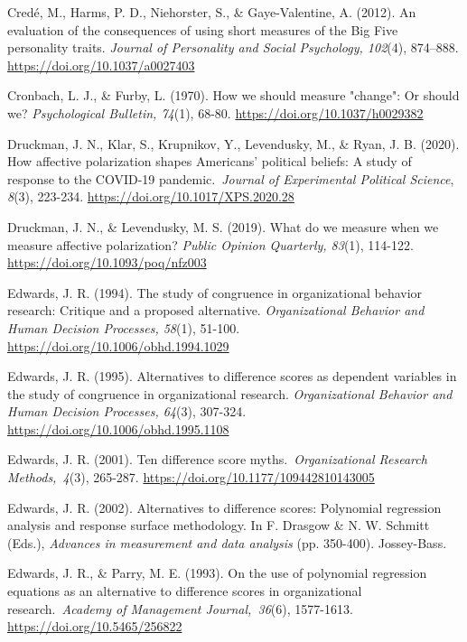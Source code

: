 \documentclass[authordate, meta, issue]{jote-new-article}
\begin{document}
	Credé, M., Harms, P. D., Niehorster, S., \& Gaye-Valentine, A. (2012). An evaluation of the consequences of using short measures of the Big Five personality traits. \emph{Journal of Personality and Social Psychology, 102}(4), 874--888. \url{https://doi.org/10.1037/a0027403}



	Cronbach, L. J., \& Furby, L. (1970). How we should measure "change": Or should we? \emph{Psychological Bulletin, 74}(1), 68-80. \url{https://doi.org/10.1037/h0029382}



	Druckman, J. N., Klar, S., Krupnikov, Y., Levendusky, M., \& Ryan, J. B. (2020). How affective polarization shapes Americans' political beliefs: A study of response to the COVID-19 pandemic. \emph{Journal of Experimental Political Science}, \emph{8}(3), 223-234. \url{https://doi.org/10.1017/XPS.2020.28}


	Druckman, J. N., \& Levendusky, M. S. (2019). What do we measure when we measure affective polarization? \emph{Public Opinion Quarterly, 83}(1), 114-122. \url{https://doi.org/10.1093/poq/nfz003}



	Edwards, J. R. (1994). The study of congruence in organizational behavior research: Critique and a proposed alternative. \emph{Organizational Behavior and Human Decision Processes, 58}(1), 51-100. \url{https://doi.org/10.1006/obhd.1994.1029}



	Edwards, J. R. (1995). Alternatives to difference scores as dependent variables in the study of congruence in organizational research. \emph{Organizational Behavior and Human Decision Processes, 64}(3), 307-324. \url{https://doi.org/10.1006/obhd.1995.1108}



	Edwards, J. R. (2001). Ten difference score myths.\emph{ Organizational Research Methods, 4}(3), 265-287. \url{https://doi.org/10.1177/109442810143005}



	Edwards, J. R. (2002). Alternatives to difference scores: Polynomial regression analysis and response surface methodology. In F. Drasgow \& N. W. Schmitt (Eds.), \emph{Advances in measurement and data analysis} (pp. 350-400). Jossey-Bass.



	Edwards, J. R., \& Parry, M. E. (1993). On the use of polynomial regression equations as an alternative to difference scores in organizational research.\emph{ Academy of Management Journal, 36}(6), 1577-1613. \url{https://doi.org/10.5465/256822}
\end{document}
